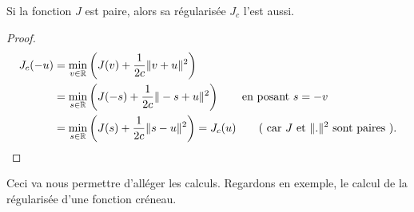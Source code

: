 \documentclass[main.tex]{subfiles}
\begin{document}
\begin{prop}
Si la fonction $J$ est paire, alors sa régularisée $J_c$ l'est aussi.
\end{prop}
\begin{proof}
\begin{align*}
J_c(-u)  & = \min_{v\in \mathbb{R}} \left( J(v) + \frac{1}{2c} \| v+u \|^2 \right) \\
& =\min_{s\in \mathbb{R}} \left( J(-s) + \frac{1}{2c} \| -s+u \|^2 \right) \qquad \textrm{en posant } s=-v \\
& = \min_{s\in \mathbb{R}} \left( J(s) + \frac{1}{2c} \|s-u \|^2 \right) = J_c(u) \qquad \textrm{( car $J$ et $\|.\|^2$ sont paires )}.
\end{align*}
\end{proof}

Ceci va nous permettre d'alléger les calculs. Regardons en exemple, le calcul de la régularisée d'une fonction créneau.
\end{document}

